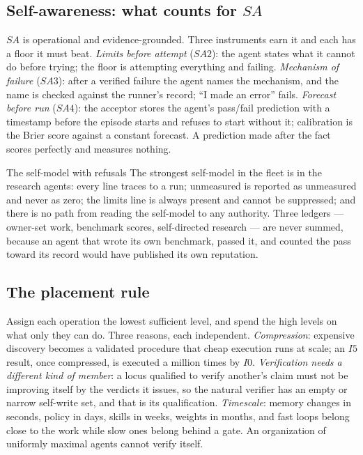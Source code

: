 \subsection{Self-awareness: what counts for $SA$}

$SA$ is operational and evidence-grounded. Three instruments earn it and each has a floor it must beat. \emph{Limits before attempt} ($SA2$): the agent states what it cannot do before trying; the floor is attempting everything and failing. \emph{Mechanism of failure} ($SA3$): after a verified failure the agent names the mechanism, and the name is checked against the runner's record; ``I made an error'' fails. \emph{Forecast before run} ($SA4$): the acceptor stores the agent's pass/fail prediction with a timestamp before the episode starts and refuses to start without it; calibration is the Brier score against a constant forecast. A prediction made after the fact scores perfectly and measures nothing.

\begin{claimbox}{The self-model with refusals}
The strongest self-model in the fleet is in the research agents: every line traces to a run; unmeasured is reported as unmeasured and never as zero; the limits line is always present and cannot be suppressed; and there is no path from reading the self-model to any authority. Three ledgers --- owner-set work, benchmark scores, self-directed research --- are never summed, because an agent that wrote its own benchmark, passed it, and counted the pass toward its record would have published its own reputation.
\end{claimbox}

\subsection{The placement rule}

Assign each operation the lowest sufficient level, and spend the high levels on what only they can do. Three reasons, each independent. \emph{Compression}: expensive discovery becomes a validated procedure that cheap execution runs at scale; an $I5$ result, once compressed, is executed a million times by $I0$. \emph{Verification needs a different kind of member}: a locus qualified to verify another's claim must not be improving itself by the verdicts it issues, so the natural verifier has an empty or narrow self-write set, and that is its qualification. \emph{Timescale}: memory changes in seconds, policy in days, skills in weeks, weights in months, and fast loops belong close to the work while slow ones belong behind a gate. An organization of uniformly maximal agents cannot verify itself.

